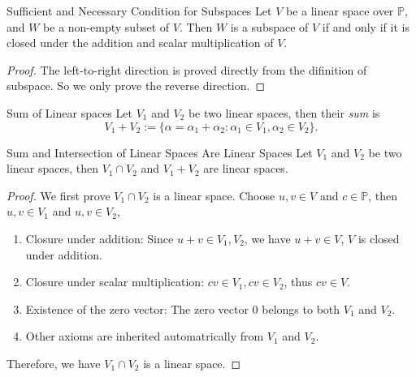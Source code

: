\begin{proposition}{Sufficient and Necessary Condition for Subspaces}{}
  Let $V$ be a linear space over $\mathbb{P}$,
  and $W$ be a non-empty subset of $V$.
  Then $W$ is a subspace of $V$ if and only if
  it is closed under the addition and scalar multiplication of $V$.
\end{proposition}

\begin{proof}
  The left-to-right direction is proved directly from the difinition of subspace.
  So we only prove the reverse direction.
\end{proof}

\begin{definition}{Sum of Linear spaces}{}
  Let $V_1$ and $V_2$ be two linear spaces, then their \emph{sum} is
  \begin{equation}
    V_1 + V_2 := \{\alpha = \alpha_1 + \alpha_2: \alpha_1 \in V_1, \alpha_2 \in V_2\}.
  \end{equation}
\end{definition}

\begin{proposition}{Sum and Intersection of Linear Spaces Are Linear Spaces}{}
  Let $V_1$ and $V_2$ be two linear spaces,
  then $V_1 \cap V_2$ and $V_1 + V_2$ are linear spaces.
\end{proposition}

\begin{proof}
  We first prove $V_1 \cap V_2$ is a linear space.
  Choose $u, v \in V$ and $c \in \mathbb{P}$, then $u, v \in V_1$ and $u, v \in V_2$,
  \begin{enumerate}
  \item Closure under addition: Since $u + v \in V_1, V_2$, we have $u + v \in
    V$, $V$ is closed under addition.
  \item Closure under scalar multiplication: $c v \in V_1, c v \in V_2$,
    thus $c v \in V$.
  \item Existence of the zero vector: The zero vector $0$ belongs to both $V_1$
    and $V_2$.
  \item Other axioms are inherited automatrically from $V_1$ and $V_2$.
  \end{enumerate}
  Therefore, we have $V_1 \cap V_2$ is a linear space.
\end{proof}

